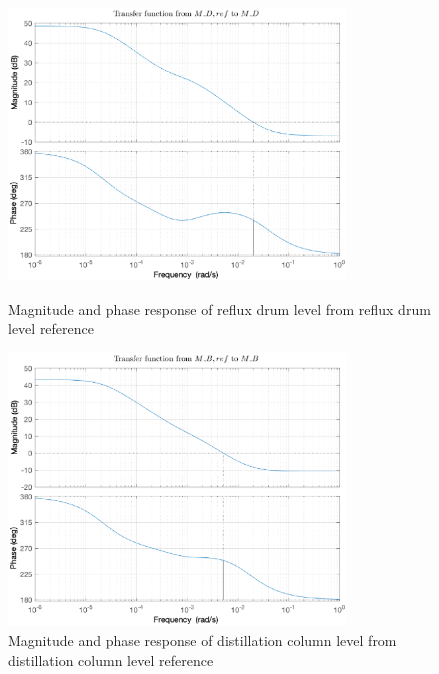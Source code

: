 \documentclass[12pt]{article}
\begin{document}
\begin{figure}
\centering
\includegraphics[width=0.8\textwidth]{../Systemanalyse/Log_Data_to_Matlab/Figurer/Identifisering/MD_bode.eps}
\caption{Magnitude and phase response of reflux drum level from reflux drum level reference}
\label{fig:L11}

\includegraphics[width=0.8\textwidth]{../Systemanalyse/Log_Data_to_Matlab/Figurer/Identifisering/MB_bode.eps}
\caption{Magnitude and phase response of distillation column level from distillation column level reference}
\label{fig:L22}
\end{figure}

\end{document}
